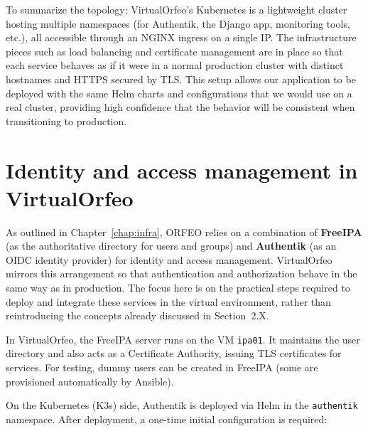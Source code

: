 \medskip

To summarize the topology: VirtualOrfeo’s Kubernetes is a lightweight cluster
hosting multiple namespaces (for Authentik, the Django app, monitoring tools,
etc.), all accessible through an NGINX ingress on a single IP. The infrastructure
pieces such as load balancing and certificate management are in place so that
each service behaves as if it were in a normal production cluster with distinct
hostnames and HTTPS secured by TLS. This setup allows our application to be
deployed with the same Helm charts and configurations that we would use on a
real cluster, providing high confidence that the behavior will be consistent when
transitioning to production.


\section{Identity and access management in VirtualOrfeo} \label{sec:virtualorfeo-iam}

As outlined in Chapter~\ref{chap:infra}, ORFEO relies on a combination of 
\textbf{FreeIPA} (as the authoritative directory for users and groups) and 
\textbf{Authentik} (as an OIDC identity provider) for identity and access 
management. VirtualOrfeo mirrors this arrangement so that authentication and 
authorization behave in the same way as in production. The focus here is on 
the practical steps required to deploy and integrate these services in the 
virtual environment, rather than reintroducing the concepts already discussed 
in Section~2.X. 

\medskip

In VirtualOrfeo, the FreeIPA server runs on the VM \texttt{ipa01}. It maintains 
the user directory and also acts as a Certificate Authority, issuing TLS 
certificates for services. For testing, dummy users can be created in FreeIPA 
(some are provisioned automatically by Ansible).  

On the Kubernetes (K3s) side, Authentik is deployed via Helm in the 
\texttt{authentik} namespace. After deployment, a one-time initial configuration 
is required:

